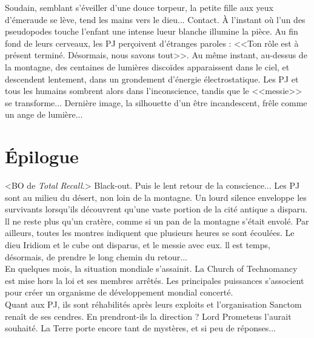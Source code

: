 \documentclass[11pt,twoside,a4paper]{book}
\begin{document}
Soudain, semblant s'{\'e}veiller d'une douce torpeur, la petite fille aux yeux d'{\'e}meraude se l{\`e}ve, tend les mains vers le dieu... Contact. {\`A} l'instant o{\`u} l'un des pseudopodes touche l'enfant une intense lueur blanche illumine la pi{\`e}ce. Au fin fond de leurs cerveaux, les PJ per\c{c}oivent d'{\'e}tranges paroles : <<Ton r{\^o}le est {\`a} pr{\'e}sent termin{\'e}. D{\'e}sormais, nous savons tout>>. Au m{\^e}me instant, au-dessus de la montagne, des centaines de lumi{\`e}res disco{\"i}des apparaissent dans le ciel, et descendent lentement, dans un grondement d'{\'e}nergie {\'e}lectrostatique. Les PJ et tous les humains sombrent alors dans l'inconscience, tandis que le <<messie>> se transforme... Derni{\`e}re image, la silhouette d'un {\^e}tre incandescent, fr{\^e}le comme un ange de lumi{\`e}re... %

\clearpage

\section*{{\'E}pilogue}

<BO de \emph{Total Recall}.> Black-out. Puis le lent retour de la conscience... Les PJ sont au milieu du d{\'e}sert, non loin de la montagne. Un lourd silence enveloppe les survivants lorsqu'ils d{\'e}couvrent qu'une vaste portion de la cit{\'e} antique a disparu. ll ne reste plus qu'un crat{\`e}re, comme si un pan de la montagne s'{\'e}tait envol{\'e}. Par ailleurs, toutes les montres indiquent que plusieurs heures se sont {\'e}coul{\'e}es. Le dieu Iridiom et le cube ont disparus, et le messie avec eux. ll est temps, d{\'e}sormais, de prendre le long chemin du retour...~\\

En quelques mois, la situation mondiale s'assainit. La Church of Technomancy est mise hors la loi et ses membres arr{\^e}t{\'e}s. Les principales puissances s'associent pour cr{\'e}er un organisme de d{\'e}veloppement mondial concert{\'e}.~\\


Quant aux PJ, ils sont r{\'e}habilit{\'e}s apr{\`e}s leurs exploits et l'organisation Sanctom rena{\^i}t de ses cendres. En prendront-ils la direction ? Lord Prometeus l'aurait souhait{\'e}. La Terre porte encore tant de myst{\`e}res, et si peu de r{\'e}ponses...~\\
\end{document}
